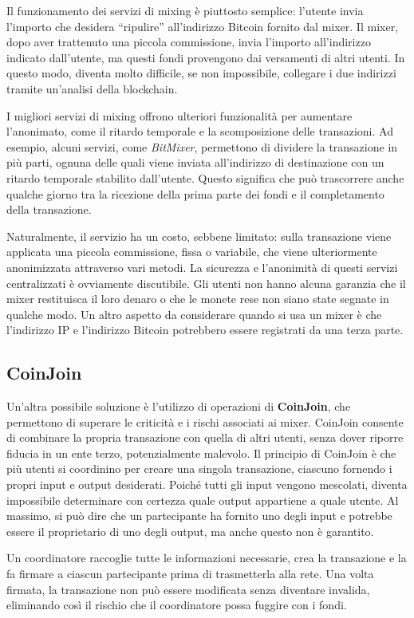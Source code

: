 Il funzionamento dei servizi di mixing è piuttosto semplice: l'utente invia l'importo che desidera “ripulire” all'indirizzo Bitcoin fornito dal mixer. Il mixer, dopo aver trattenuto una piccola commissione, invia l'importo all'indirizzo indicato dall'utente, ma questi fondi provengono dai versamenti di altri utenti. In questo modo, diventa molto difficile, se non impossibile, collegare i due indirizzi tramite un'analisi della blockchain.

I migliori servizi di mixing offrono ulteriori funzionalità per aumentare l'anonimato, come il ritardo temporale e la scomposizione delle transazioni. Ad esempio, alcuni servizi, come \textit{BitMixer}, permettono di dividere la transazione in più parti, ognuna delle quali viene inviata all'indirizzo di destinazione con un ritardo temporale stabilito dall'utente. Questo significa che può trascorrere anche qualche giorno tra la ricezione della prima parte dei fondi e il completamento della transazione.

Naturalmente, il servizio ha un costo, sebbene limitato: sulla transazione viene applicata una piccola commissione, fissa o variabile, che viene ulteriormente anonimizzata attraverso vari metodi. La sicurezza e l'anonimità di questi servizi centralizzati è ovviamente discutibile. Gli utenti non hanno alcuna garanzia che il mixer restituisca il loro denaro o che le monete rese non siano state segnate in qualche modo. Un altro aspetto da considerare quando si usa un mixer è che l'indirizzo IP e l'indirizzo Bitcoin potrebbero essere registrati da una terza parte.

\subsection{CoinJoin}
Un'altra possibile soluzione è l'utilizzo di operazioni di \textbf{CoinJoin}, che permettono di superare le criticità e i rischi associati ai mixer. CoinJoin consente di combinare la propria transazione con quella di altri utenti, senza dover riporre fiducia in un ente terzo, potenzialmente malevolo. Il principio di CoinJoin è che più utenti si coordinino per creare una singola transazione, ciascuno fornendo i propri input e output desiderati. Poiché tutti gli input vengono mescolati, diventa impossibile determinare con certezza quale output appartiene a quale utente. Al massimo, si può dire che un partecipante ha fornito uno degli input e potrebbe essere il proprietario di uno degli output, ma anche questo non è garantito.

Un coordinatore raccoglie tutte le informazioni necessarie, crea la transazione e la fa firmare a ciascun partecipante prima di trasmetterla alla rete. Una volta firmata, la transazione non può essere modificata senza diventare invalida, eliminando così il rischio che il coordinatore possa fuggire con i fondi.

